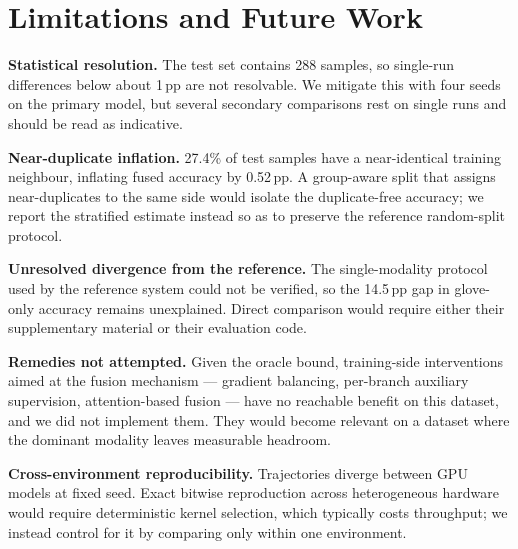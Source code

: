 \documentclass[11pt,a4paper]{article}
\begin{document}
\section{Limitations and Future Work}

\textbf{Statistical resolution.} The test set contains 288 samples, so single-run differences below about 1\,pp are not resolvable. We mitigate this with four seeds on the primary model, but several secondary comparisons rest on single runs and should be read as indicative.

\textbf{Near-duplicate inflation.} 27.4\% of test samples have a near-identical training neighbour, inflating fused accuracy by 0.52\,pp. A group-aware split that assigns near-duplicates to the same side would isolate the duplicate-free accuracy; we report the stratified estimate instead so as to preserve the reference random-split protocol.

\textbf{Unresolved divergence from the reference.} The single-modality protocol used by the reference system could not be verified, so the 14.5\,pp gap in glove-only accuracy remains unexplained. Direct comparison would require either their supplementary material or their evaluation code.

\textbf{Remedies not attempted.} Given the oracle bound, training-side interventions aimed at the fusion mechanism --- gradient balancing, per-branch auxiliary supervision, attention-based fusion --- have no reachable benefit on this dataset, and we did not implement them. They would become relevant on a dataset where the dominant modality leaves measurable headroom.

\textbf{Cross-environment reproducibility.} Trajectories diverge between GPU models at fixed seed. Exact bitwise reproduction across heterogeneous hardware would require deterministic kernel selection, which typically costs throughput; we instead control for it by comparing only within one environment.
\end{document}
